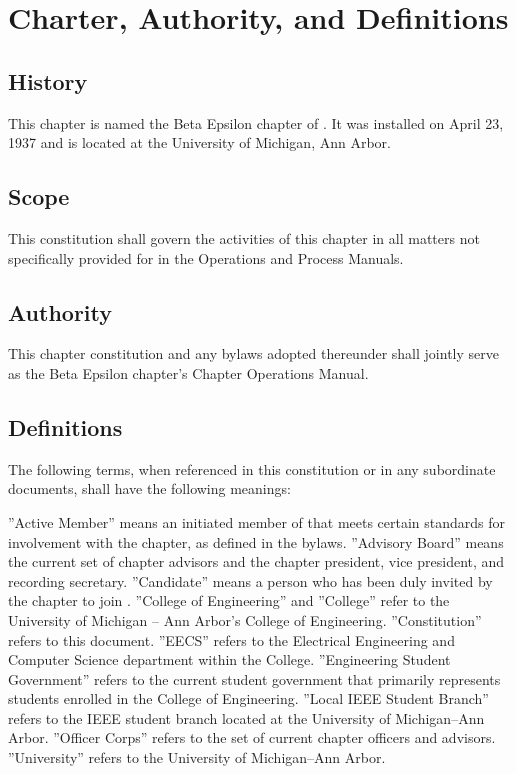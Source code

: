 \chapter{Charter, Authority, and Definitions}\label{sec:definitions}

\section{History}
This chapter is named the Beta Epsilon chapter of \hkn. It was installed on April 23, 1937 and is located at the University of Michigan, Ann Arbor.

\section{Scope}
This constitution shall govern the activities of this chapter in all matters not specifically provided for in the \hkn Operations and Process Manuals.

\section{Authority}
This chapter constitution and any bylaws adopted thereunder shall jointly serve as the Beta Epsilon chapter's Chapter Operations Manual.

\section{Definitions}
The following terms, when referenced in this constitution or in any subordinate documents, shall have the following meanings:
\begin{enumsubsection}

\itemnotoc ''Active Member'' means an initiated member of \hkn that meets certain standards for involvement with the chapter, as defined in the bylaws.
\itemnotoc ''Advisory Board'' means the current set of chapter advisors and the chapter president, vice president, and recording secretary.
\itemnotoc ''Candidate'' means a person who has been duly invited by the chapter to join \hkn.
\itemnotoc ''College of Engineering'' and ''College'' refer to the University of Michigan -- Ann Arbor's College of Engineering.
\itemnotoc ''Constitution'' refers to this document.
\itemnotoc ''EECS'' refers to the Electrical Engineering and Computer Science department within the College.
\itemnotoc ''Engineering Student Government'' refers to the current student government that primarily represents students enrolled in the College of Engineering.
\itemnotoc ''Local IEEE Student Branch'' refers to the IEEE student branch located at the University of Michigan--Ann Arbor.
\itemnotoc ''Officer Corps'' refers to the set of current chapter officers and advisors.
\itemnotoc ''University'' refers to the University of Michigan--Ann Arbor.

\end{enumsubsection}

